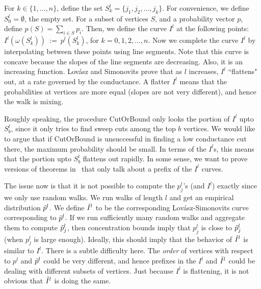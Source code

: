 \documentclass[11pt]{article}
\newcommand\CutOrBound{{\sc CutOrBound}\xspace}
\newcommand\volls{\omega}
\begin{document}
For $k \in \{1, \ldots,
n\}$, define the set $S^l_k = \{j_1, j_2, \ldots, j_k\}$. For convenience, we
define $S^l_0 = \emptyset$, the empty set. For a subset of vertices $S$, and a
probability vector $p$, define $p(S) = \sum_{i \in S} p_i$. Then, we define
the curve $I^l$ at the following points: $I^l(\volls(S^l_k))\ :=\ p^l(S^l_k)$,
for $k = 0, 1, 2, \ldots, n.$ Now we complete the curve $I^l$ by
interpolating between these points using line segments.
Note that this curve is concave because the slopes of the line segments are
decreasing. Also, it is an increasing function. Lov\'{a}sz and Simonovits
prove that as $l$ increases, $I^l$ ``flattens" out, at a rate
governed by the conductance. A flatter $I^l$ means that the probabilities
at vertices are more equal (slopes are not very different), and hence
the walk is mixing.

Roughly speaking, the procedure {\CutOrBound} only looks the portion
of $I^l$ upto $S^l_b$, since it only tries to find sweep cuts among the
top $b$ vertices. We would like to argue that if {\CutOrBound}
is unsuccessful in finding a low conductance cut there, the
maximum probability should be small. In terms of the $I^l$s,
this means that the portion upto $S^l_b$ flattens out rapidly.
In some sense, we want to prove versions of theorems
in~\cite{LS90} that only talk about a prefix of the
$I^l$ curves.

The issue now is that it is not possible to compute the $p^l_j$'s (and $I^l$)
exactly since we only use random walks. We run walks
of length $l$ and get an empirical distribution
$\tilde{p}^l$. We define $\tilde{I}^l$ to be the
corresponding Lov\'{a}sz-Simonovits curve corresponding to
$\tilde{p}^l$. If we run sufficiently many random walks and aggregate them to compute $\tilde{p}^l_j$, then concentration bounds imply that $p^l_j$ is close
to $\tilde{p}^l_j$ (when $p^l_j$ is large enough). Ideally, this should imply
that the behavior of $\tilde{I}^l$ is similar to $I^l$.
There is a subtle difficulty here. The \emph{order}
of vertices with respect to $p^l$ and $\tilde{p}^l$ could
be very different, and hence prefixes in the $I^l$ and
$\tilde{I}^l$ could be dealing with different subsets
of vertices. Just because $I^l$ is flattening, it is
not obvious that $\tilde{I}^l$ is doing the same.
\end{document}
